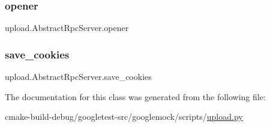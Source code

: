 \mbox{\label{classupload_1_1AbstractRpcServer_aa931446476e0e86f3ade7fef0a0aea5a}} 
\subsubsection{\texorpdfstring{opener}{opener}}
{\footnotesize\ttfamily upload.\+Abstract\+Rpc\+Server.\+opener}

\mbox{\label{classupload_1_1AbstractRpcServer_affe342205c4647d41b127f5a5634858b}} 
\subsubsection{\texorpdfstring{save\_cookies}{save\_cookies}}
{\footnotesize\ttfamily upload.\+Abstract\+Rpc\+Server.\+save\+\_\+cookies}



The documentation for this class was generated from the following file\+:\begin{DoxyCompactItemize}
\item 
cmake-\/build-\/debug/googletest-\/src/googlemock/scripts/\mbox{\hyperlink{googlemock_2scripts_2upload_8py}{upload.\+py}}\end{DoxyCompactItemize}
